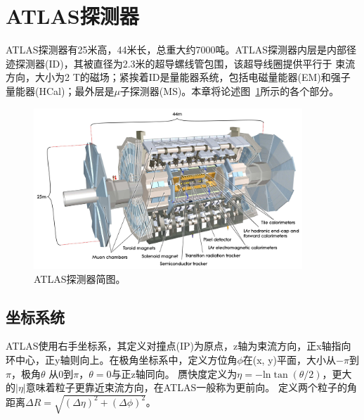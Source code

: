 \section{ATLAS探测器} \label{sec:ATLAS}
ATLAS探测器有25米高，44米长，总重大约7000吨。ATLAS探测器内层是内部径迹探测器(ID)，其被直径为2.3米的超导螺线管包围，该超导线圈提供平行于
束流方向，大小为2 T的磁场；紧挨着ID是量能器系统，包括电磁量能器(EM)和强子量能器(HCal)；最外层是$\mu$子探测器(MS)。本章将论述图~\ref{fig:ATLAS_schematic}所示的各个部分。

\begin{figure}[h]
\begin{center}
\includegraphics[width=0.9\textwidth]{fig/ATLAS_SE_Corrected7.pdf}
\caption{ATLAS探测器简图。} \label{fig:ATLAS_schematic}
\end{center}
\end{figure}

\subsection{坐标系统}
ATLAS使用右手坐标系，其定义对撞点(IP)为原点，z轴为束流方向，正x轴指向环中心，正y轴则向上。在极角坐标系中，定义方位角$\phi$在(x, y)平面，大小从$-\pi$到$\pi$，极角$\theta$
从0到$\pi$，$\theta=0$与正z轴同向。
赝快度定义为$\eta = -\text{ln}\tan(\theta/2)$，更大的$|\eta|$意味着粒子更靠近束流方向，在ATLAS一般称为更前向。
定义两个粒子的角距离$\Delta R=\sqrt{(\Delta\eta)^2+(\Delta\phi)^2}$。

